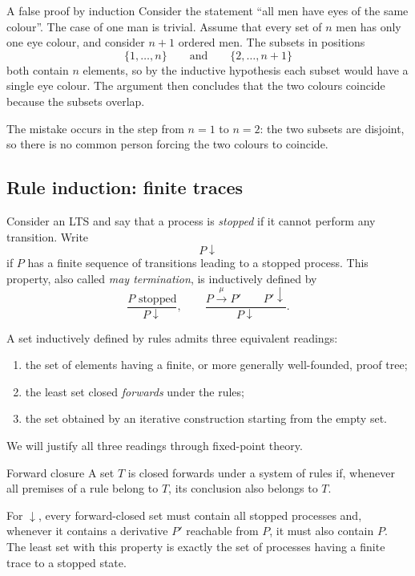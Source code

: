 \documentclass[a4paper]{article}
\newcommand{\trans}[1]{\xrightarrow{#1}}
\begin{document}
\begin{snippetexample}{A false proof by induction}
    Consider the statement ``all men have eyes of the same colour''.
    The case of one man is trivial.
    Assume that every set of \(n\) men has only one eye colour, and consider \(n+1\) ordered men.
    The subsets in positions
    \[
        \{1,\ldots,n\}
        \qquad\text{and}\qquad
        \{2,\ldots,n+1\}
    \]
    both contain \(n\) elements, so by the inductive hypothesis each subset would have a single eye colour.
    The argument then concludes that the two colours coincide because the subsets overlap.

    The mistake occurs in the step from \(n=1\) to \(n=2\): the two subsets are disjoint, so there is no common person forcing the two colours to coincide.
\end{snippetexample}

\subsection{Rule induction: finite traces}

Consider an LTS and say that a process is \emph{stopped} if it cannot perform any transition.
Write
\[
    P\downarrow
\]
if \(P\) has a finite sequence of transitions leading to a stopped process.
This property, also called \emph{may termination}, is inductively defined by
\[
    \frac{P\text{ stopped}}{P\downarrow},
    \qquad
    \frac{P\trans{\mu}P'\qquad P'\downarrow}{P\downarrow}.
\]

A set inductively defined by rules admits three equivalent readings:
\begin{enumerate}
    \item the set of elements having a finite, or more generally well-founded, proof tree;
    \item the least set closed \emph{forwards} under the rules;
    \item the set obtained by an iterative construction starting from the empty set.
\end{enumerate}
We will justify all three readings through fixed-point theory.

\begin{snippetdefinition}{Forward closure}
    A set \(T\) is closed forwards under a system of rules if, whenever all premises of a rule belong to \(T\), its conclusion also belongs to \(T\).
\end{snippetdefinition}

For \(\downarrow\), every forward-closed set must contain all stopped processes and, whenever it contains a derivative \(P'\) reachable from \(P\), it must also contain \(P\).
The least set with this property is exactly the set of processes having a finite trace to a stopped state.
\end{document}
